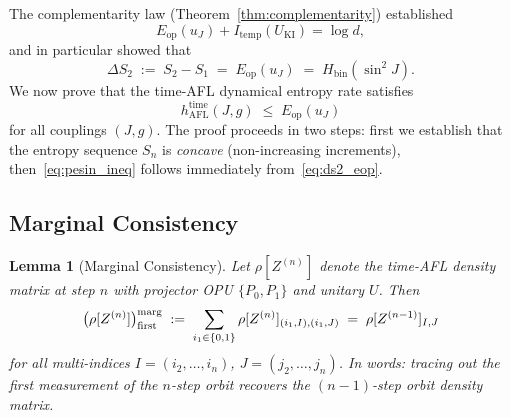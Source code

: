 \documentclass[12pt,a4paper]{article}
\newtheorem{lemma}[theorem]{Lemma}
\begin{document}
The complementarity law (Theorem~\ref{thm:complementarity}) established
\begin{equation}
  E_\mathrm{op}(u_J) + I_\mathrm{temp}(U_\mathrm{KI}) = \log d,
\end{equation}
and in particular showed that
\begin{equation}\label{eq:ds2_eop}
  \Delta S_2 \;:=\; S_2 - S_1 \;=\; E_\mathrm{op}(u_J) \;=\; H_\mathrm{bin}(\sin^2\!J).
\end{equation}
We now prove that the time-AFL dynamical entropy rate satisfies
\begin{equation}\label{eq:pesin_ineq}
  h_\mathrm{AFL}^\mathrm{time}(J,g) \;\le\; E_\mathrm{op}(u_J)
\end{equation}
for all couplings $(J,g)$.  The proof proceeds in two steps: first we
establish that the entropy sequence $S_n$ is \emph{concave} (non-increasing
increments), then~\eqref{eq:pesin_ineq} follows immediately from~\eqref{eq:ds2_eop}.

\subsection{Marginal Consistency}

\begin{lemma}[Marginal Consistency]\label{lem:marginal}
Let $\rho[Z^{(n)}]$ denote the time-AFL density matrix at step $n$ with
projector OPU $\{P_0,P_1\}$ and unitary $U$.  Then
\begin{equation}
  \bigl(\rho[Z^{(n)}]\bigr)^\mathrm{marg}_{\rm first}
  \;:=\;
  \sum_{i_1\in\{0,1\}} \rho[Z^{(n)}]_{(i_1,I),(i_1,J)}
  \;=\;
  \rho[Z^{(n-1)}]_{I,J}
\end{equation}
for all multi-indices $I=(i_2,\ldots,i_n)$, $J=(j_2,\ldots,j_n)$.
In words: tracing out the first measurement of the $n$-step orbit recovers
the $(n-1)$-step orbit density matrix.
\end{lemma}
\end{document}

